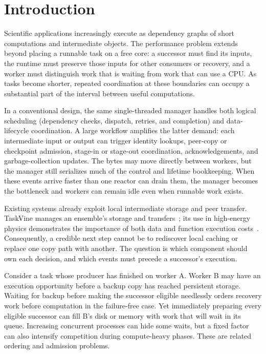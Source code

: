 \section{Introduction}
Scientific applications increasingly execute as dependency graphs of short
computations and intermediate objects. The performance problem extends beyond
placing a runnable task on a free core: a successor must find its inputs, the
runtime must preserve those inputs for other consumers or recovery, and a
worker must distinguish work that is waiting from work that can use a CPU.
As tasks become shorter, repeated coordination at these boundaries can occupy
a substantial part of the interval between useful computations.

In a conventional design, the same single-threaded manager handles both
logical scheduling (dependency checks, dispatch, retries, and completion) and
data-lifecycle coordination. A large workflow amplifies the latter demand:
each intermediate input or output can trigger identity lookups, peer-copy or
checkpoint admission, stage-in or stage-out coordination, acknowledgements,
and garbage-collection updates. The bytes may move directly between workers,
but the manager still serializes much of the control and lifetime bookkeeping.
When these events arrive faster than one reactor can drain them, the manager
becomes the bottleneck and workers can remain idle even when runnable work
exists.

Existing systems already exploit local intermediate storage and peer transfer.
TaskVine manages an ensemble's storage and transfers~\cite{taskvine}; its use in
high-energy physics demonstrates the importance of both data and function
execution costs~\cite{hep}. Consequently, a credible next step cannot be to
rediscover local caching or replace one copy path with another. The question is
which component should own each decision, and which events must precede a
successor's execution.

Consider a task whose producer has finished on worker A. Worker B may have an
execution opportunity before a backup copy has reached persistent storage.
Waiting for backup before making the successor eligible needlessly orders
recovery work before computation in the failure-free case. Yet immediately
preparing every eligible successor can fill B's disk or memory with work that
will wait in its queue. Increasing concurrent processes can hide some waits,
but a fixed factor can also intensify competition during compute-heavy phases.
These are related ordering and admission problems.

